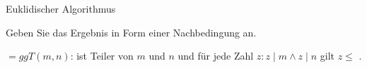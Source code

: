\addtocounter{exercise}{-1}\addtocounter{solve}{-1}%
\begin{frame}[fragile]{Euklidischer Algorithmus}
    \begin{exercise}[c)]
        Geben Sie das Ergebnis in Form einer Nachbedingung an.
    \end{exercise}
    \pause[]
    \begin{solve}[c)]
         $=ggT(m,n)$:  ist Teiler von $m$ und $n$ und für jede Zahl $z:z\mid m\wedge z\mid n$ gilt $z\leq$ .
    \end{solve}
\end{frame}